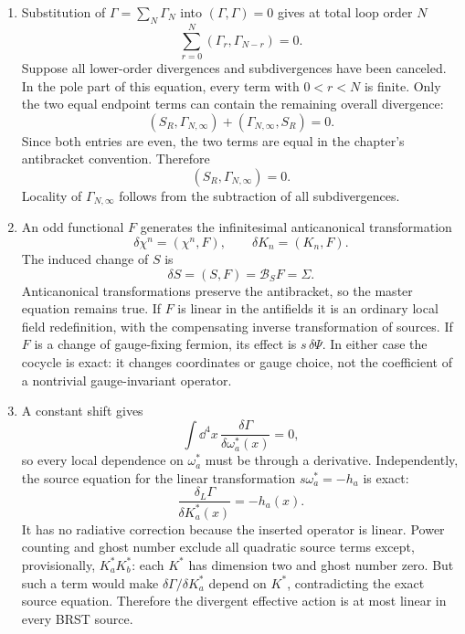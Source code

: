 \begin{enumerate}
  \begin{enumerate}
    \item[(a)]
    Substitution of \(\Gamma=\sum_N\Gamma_N\) into
    \((\Gamma,\Gamma)=0\) gives at total loop order \(N\)
    \[
      \boxed{\sum_{r=0}^{N}(\Gamma_r,\Gamma_{N-r})=0.}
    \]
    Suppose all lower-order divergences and subdivergences have been
    canceled.  In the pole part of this equation, every term with
    \(0<r<N\) is finite.  Only the two equal endpoint terms can contain
    the remaining overall divergence:
    \[
      (S_R,\Gamma_{N,\infty})
        +(\Gamma_{N,\infty},S_R)=0.
    \]
    Since both entries are even, the two terms are equal in the chapter's
    antibracket convention.  Therefore
    \[
      \boxed{(S_R,\Gamma_{N,\infty})=0.}
    \]
    Locality of \(\Gamma_{N,\infty}\) follows from the subtraction of all
    subdivergences.
    \item[(b)]
    An odd functional \(F\) generates the infinitesimal anticanonical
    transformation
    \[
      \delta\chi^n=(\chi^n,F),\qquad
      \delta K_n=(K_n,F).
    \]
    The induced change of \(S\) is
    \[
      \delta S=(S,F)=\mathcal B_SF=\Sigma .
    \]
    Anticanonical transformations preserve the antibracket, so the master
    equation remains true.  If \(F\) is linear in the antifields it is an
    ordinary local field redefinition, with the compensating inverse
    transformation of sources.  If \(F\) is a change of gauge-fixing
    fermion, its effect is \(s\,\delta\Psi\).  In either case the cocycle is
    exact: it changes coordinates or gauge choice, not the coefficient of a
    nontrivial gauge-invariant operator.
    \item[(c)]
    A constant shift gives
    \[
      \boxed{\int \dd^4x\,
        \frac{\delta\Gamma}{\delta\omega_a^*(x)}=0,}
    \]
    so every local dependence on \(\omega_a^*\) must be through a
    derivative.  Independently, the source equation for the linear
    transformation \(s\omega_a^*=-h_a\) is exact:
    \[
      \frac{\delta_L\Gamma}{\delta K_a^*(x)}
        =-h_a(x).
    \]
    It has no radiative correction because the inserted operator is linear.
    Power counting and ghost number exclude all quadratic source terms
    except, provisionally, \(K_a^*K_b^*\): each \(K^*\) has
    dimension two and ghost number zero.  But such a term would make
    \(\delta\Gamma/\delta K_a^*\) depend on \(K^*\), contradicting the
    exact source equation.  Therefore the divergent effective action is at
    most linear in every BRST source.
  \end{enumerate}


\end{enumerate}
